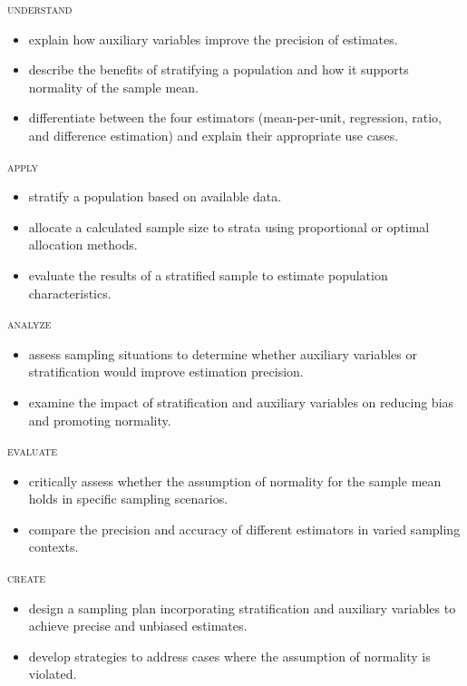 \noindent \textsc{understand}
\begin{itemize}

\item explain how auxiliary variables improve the precision of estimates.
\item describe the benefits of stratifying a population and how it supports normality of the sample mean.
\item differentiate between the four estimators (mean-per-unit, regression, ratio, and difference estimation) and explain their appropriate use cases.
\end{itemize}

\noindent \textsc{apply}
\begin{itemize}

\item stratify a population based on available data.
\item allocate a calculated sample size to strata using proportional or optimal allocation methods.
\item evaluate the results of a stratified sample to estimate population characteristics.
\end{itemize}

\noindent \textsc{analyze}
\begin{itemize}

\item assess sampling situations to determine whether auxiliary variables or stratification would improve estimation precision.
\item examine the impact of stratification and auxiliary variables on reducing bias and promoting normality.
\end{itemize}

\noindent \textsc{evaluate}
\begin{itemize}

\item critically assess whether the assumption of normality for the sample mean holds in specific sampling scenarios.
\item compare the precision and accuracy of different estimators in varied sampling contexts.
\end{itemize}

\noindent \textsc{create}
\begin{itemize}

\item design a sampling plan incorporating stratification and auxiliary variables to achieve precise and unbiased estimates.
\item develop strategies to address cases where the assumption of normality is violated.

\end{itemize}


